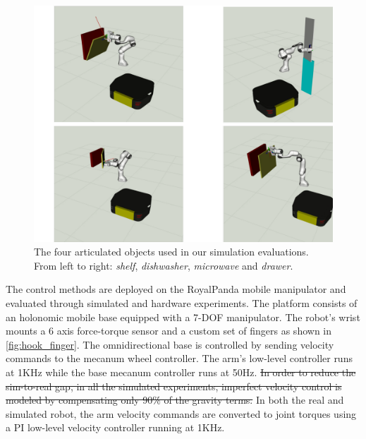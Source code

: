 \begin{figure}[t]
\centering
  \includegraphics[width=0.7\columnwidth]{framework_manipulation/figures/mosaics/articulated_objects_sim_2x2.pdf}
  \caption{The four articulated objects used in our simulation evaluations. From left to right: \textit{shelf}, \textit{dishwasher}, \textit{microwave} and \textit{drawer}.} \label{fig:object_manipulation}
\end{figure}


The control methods are deployed on the RoyalPanda mobile manipulator and evaluated through simulated and hardware experiments. The platform consists of an holonomic mobile base equipped with a 7-DOF manipulator. The robot's wrist mounts a 6 axis force-torque sensor and a custom set of fingers as shown in \fig\ref{fig:hook_finger}.  The omnidirectional base is controlled by sending velocity commands to the mecanum wheel controller. The arm's low-level controller runs at 1KHz while the base mecanum controller runs at 50Hz. \sout{In order to reduce the sim-to-real gap, in all the simulated experiments, imperfect velocity control is modeled by compensating only 90\% of the gravity terms. }In both the real and simulated robot, the arm velocity commands are converted to joint torques using a PI low-level velocity controller running at 1KHz. 


